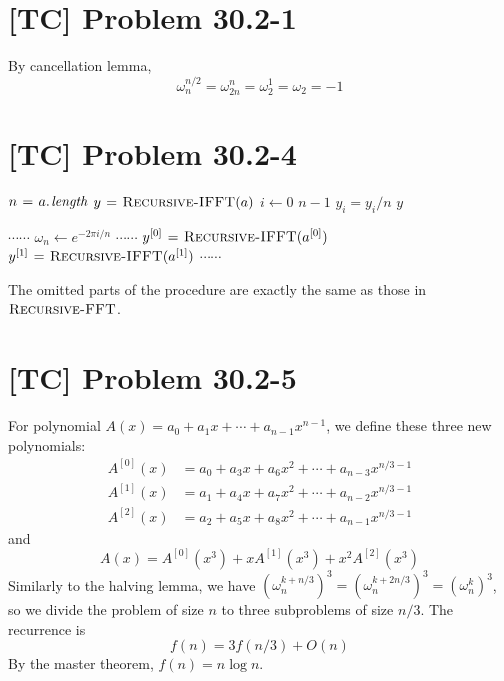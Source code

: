 \documentclass[a4paper,11pt,twocolumn]{article}
\begin{document}
  \section{[TC] Problem 30.2-1}
  By cancellation lemma,
  $$ \omega_{n}^{n/2} = \omega_{2n}^{n} = \omega_{2}^{1} = \omega_{2} = -1 $$

  \section{[TC] Problem 30.2-4}
  \begin{codebox}
    \li $n \gets \attrib{a}{length}$
    \li $y \mathrel{\hspace{1pt}=\hspace{1pt}} \textnormal{\scshape Recursive-IFFT}(a)$
    \li \For $i \gets 0$ \To $n-1$
    \li \Do  $y_i = y_i / n$
        \End
    \li \Return $y$
  \end{codebox}
  \begin{codebox}
    \zi $\cdots \cdots$ \label{li:ifft}
    \li $\omega_n \gets e^{-2\pi i / n}$
    \zi $\cdots \cdots$
    \li $y^{[0]} \mathrel{\hspace{1pt}=\hspace{1pt}} \textnormal{\scshape Recursive-IFFT}(a^{[0]})$
    \li $y^{[1]} \mathrel{\hspace{1pt}=\hspace{1pt}} \textnormal{\scshape Recursive-IFFT}(a^{[1]})$
    \zi $\cdots \cdots$
  \end{codebox}
  The omitted parts of the procedure are exactly the same as those in $\textnormal{\scshape Recursive-FFT}$.

  \section{[TC] Problem 30.2-5}
  For polynomial $A(x) = a_0 + a_1 x + \cdots + a_{n-1}x^{n-1}$, we define these three new polynomials:
  \begin{align*}
    A^{[0]}(x) &= a_0 + a_3 x + a_6 x^2 + \cdots + a_{n-3} x^{n/3 - 1} \\
    A^{[1]}(x) &= a_1 + a_4 x + a_7 x^2 + \cdots + a_{n-2} x^{n/3 - 1} \\
    A^{[2]}(x) &= a_2 + a_5 x + a_8 x^2 + \cdots + a_{n-1} x^{n/3 - 1}
  \end{align*}
  and
  $$ A(x) = A^{[0]}(x^3) + x A^{[1]}(x^3) + x^2 A^{[2]}(x^3) $$
  Similarly to the halving lemma, we have $(\omega_{n}^{k+n/3})^3 = (\omega_{n}^{k+2n/3})^3 = (\omega_{n}^{k})^3$, so we divide the problem of size $n$ to three subproblems of size $n/3$. The recurrence is
  $$ f(n) = 3f(n/3) + O(n)$$
  By the master theorem, $f(n) = n \log n$.
\end{document}
